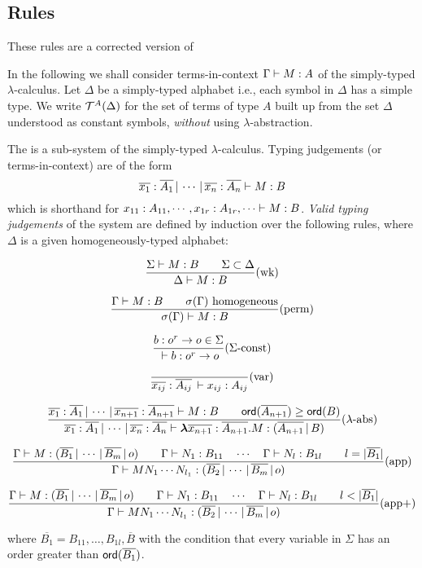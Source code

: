 \subsection{Rules }

These rules are a corrected version of
\cite{DBLP:conf/fossacs/AehligMO05}

 In the following we shall
consider terms-in-context ${{\Gamma} \vdash {M : A}}$ of the simply-typed
$\lambda$-calculus. Let $\Delta$ be a simply-typed alphabet i.e.,
each symbol in $\Delta$ has a simple type. We write
${\cal T}^{A}(\Delta)$ for the set of terms of type $A$ built up from
the set $\Delta$ understood as constant symbols, \emph{without}
using $\lambda$-abstraction.


The  is a sub-system of the
simply-typed $\lambda$-calculus. Typing judgements (or
terms-in-context) are of the form
\begin{equation}
\nonumber {{\overline{x_1}:\overline{A_1} \, | \, \cdots \, | \,
\overline{x_n} :  \overline{A_n}} \vdash {M : B}}
\end{equation}
which is shorthand for ${{x_{11} : A_{11}, \cdots, x_{1r}:
A_{1r}, \cdots} \vdash {M : B}}$. \emph{Valid typing judgements} of the
system are defined by induction over the following rules, where
$\Delta$ is a given homogeneously-typed alphabet:

\[ {    { {{\Sigma} \vdash {M:B}} \qquad {\Sigma \subset \Delta} }
    \over
        { {{\Delta } \vdash {M : B}}}
   }
   (\mbox{wk})
\]

\[  {
      { {{\Gamma} \vdash {M:B}} \qquad \sigma(\Gamma) \hbox{ homogeneous} }
    \over
      { {{\sigma(\Gamma)} \vdash {M : B}} }
    }
    (\mbox{perm})
\]


\[{ {b : o^r \rightarrow o \in \Sigma } \over {{{} \vdash {b : o^r \rightarrow o}}}}  (\Sigma\mbox{-const})  \]

\[{ \over
{{{\overline{x_{ij}} : \overline{A_{ij}}\, } \vdash {x_{ij} :
A_{ij}}}}}(\mbox{var})\]

\[
{ {{{\overline{x_1} : \overline{A_1}\, | \, \cdots\, | \,
\overline{x_{n+1}} : \overline{A_{n+1}}} \vdash {M : B}}} \qquad
{\sf ord}(\overline{A_{n+1}}) \geq {\sf ord}(B) \over {{{\overline{x_1} :
\overline{A_1}\, | \, \cdots\, | \, \overline{x_{n}} :
\overline{A_{n}}} \vdash {{\hbox{\boldmath $\lambda$}{\overline{x_{n+1}} : \overline{A_{n+1}}}.{M}}
: (\overline{A_{n+1}} \, | \, B)}}} } (\mbox{$\lambda$-abs})\]

\[ {{{{\Gamma} \vdash {M : (\overline{B_1} \, | \, \cdots \, | \, \overline{B_m} \, | \, o)}} \qquad
{{\Gamma} \vdash {N_1 : B_{11}}} \quad \cdots \quad {{\Gamma} \vdash {N_{l} : B_{1l}}} \qquad l = |\overline{B_1}|
}
\over{ {{\Gamma} \vdash {M N_1 \cdots N_{l_1} :
(\overline{B_2} \, | \, \cdots \, | \, \overline{B_m} \, | \, o)}}}}
(\mbox{app})\]


\[ {{{{\Gamma} \vdash {M : (\overline{B_1} \, | \, \cdots \, | \, \overline{B_m} \, | \, o)}} \qquad
{{\Gamma} \vdash {N_1 : B_{11}}} \quad \cdots \quad {{\Gamma} \vdash {N_{l} : B_{1l}}} \qquad l < |\overline{B_1}|
}
\over{ {{\Gamma} \vdash {M N_1 \cdots N_{l_1} :
(\overline{B_2} \, | \, \cdots \, | \, \overline{B_m} \, | \, o)}}}}
(\mbox{app+})\]

where $\overline{B_1} = B_{11}, \ldots, B_{1l},\overline{B}$ with the condition that every variable in $\Sigma$
has an order greater than ${\sf ord}(\overline{B_1})$.
